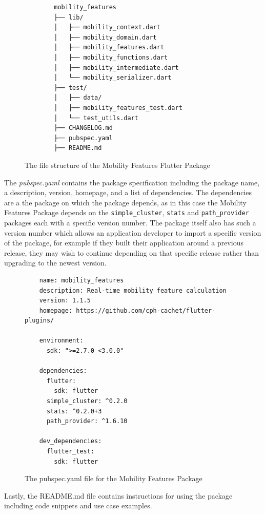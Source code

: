 \begin{figure}
    \centering
    \begin{verbatim}
        mobility_features
        ├── lib/
        │   ├── mobility_context.dart
        │   ├── mobility_domain.dart
        │   ├── mobility_features.dart
        │   ├── mobility_functions.dart
        │   ├── mobility_intermediate.dart
        │   └── mobility_serializer.dart
        ├── test/
        │   ├── data/
        │   ├── mobility_features_test.dart
        │   └── test_utils.dart
        ├── CHANGELOG.md
        ├── pubspec.yaml
        ├── README.md
    \end{verbatim}
    \caption{The file structure of the Mobility Features Flutter Package}
    \label{fig:package-structure}
\end{figure}

The \textit{pubspec.yaml} contains the package specification including the package name, a description, version, homepage, and a list of dependencies. The dependencies are a the package on which the package depends, as in this case the Mobility Features Package depends on the \verb|simple_cluster|, \verb|stats| and \verb|path_provider| packages each with a specific version number. The package itself also has such a version number which allows an application developer to import a specific version of the package, for example if they built their application around a previous release, they may wish to continue depending on that specific release rather than upgrading to the newest version.

\begin{figure}
    \centering
    \begin{verbatim}
    name: mobility_features
    description: Real-time mobility feature calculation
    version: 1.1.5
    homepage: https://github.com/cph-cachet/flutter-plugins/
    
    environment:
      sdk: ">=2.7.0 <3.0.0"
    
    dependencies:
      flutter:
        sdk: flutter
      simple_cluster: ^0.2.0
      stats: ^0.2.0+3
      path_provider: ^1.6.10
    
    dev_dependencies:
      flutter_test:
        sdk: flutter
    \end{verbatim}
    \caption{The pubspec.yaml file for the Mobility Features Package}
    \label{fig:pubspec}
\end{figure}

Lastly, the README.md file contains instructions for using the package including code snippets and use case examples. 

